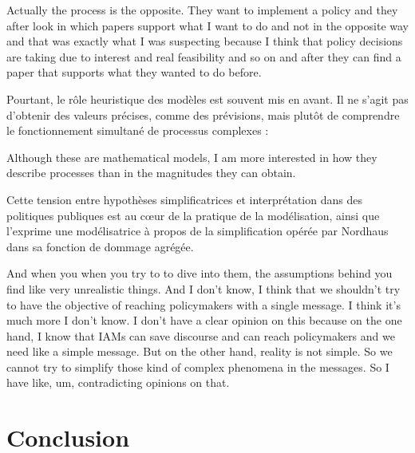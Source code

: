 \begin{authoredquote}
    Actually the process is the opposite. They want to implement a policy and they after look in  which papers support what I want to do and not in the opposite way and that was exactly what I was  suspecting because I think that policy decisions are taking due to interest and real feasibility  and so on and after they can find a paper that supports what they wanted to do before.
\end{authoredquote}

Pourtant, le rôle heuristique des modèles est souvent mis en avant. Il ne s'agit pas d'obtenir des valeurs précises, comme des prévisions, mais plutôt de comprendre le fonctionnement simultané de processus complexes : 

\begin{authoredquote}
    Although these are mathematical models, I am more interested in how they describe processes than in the magnitudes they can obtain.
\end{authoredquote}

Cette tension entre hypothèses simplificatrices et interprétation dans des politiques publiques est au cœur de la pratique de la modélisation, ainsi que l'exprime une modélisatrice à propos de la simplification opérée par Nordhaus dans sa fonction de dommage agrégée.

\begin{authoredquote}
    And when you when you try to to dive into them, the assumptions behind you find like very unrealistic things. And I don't know, I think that we shouldn't try to have the objective of reaching policymakers with a single message. I think it's much more  I don't know. I don't have a clear opinion on this because on the one hand, I know that  IAMs can save discourse and can reach policymakers and we need like a simple message. But on the other hand, reality is not simple. So we cannot try to simplify those kind of complex phenomena in the messages. So I have like, um, contradicting opinions on that.
\end{authoredquote}

\section{Conclusion}

